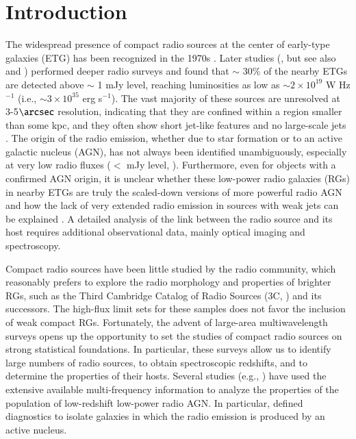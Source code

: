 \documentclass[traditabstract]{aa}
\begin{document}
\maketitle

\section{Introduction}

The widespread presence of compact radio sources at the center of
early-type galaxies (ETG) has been recognized in the 1970s
\citep{ekers73}. Later studies (\citealt{wrobel91b}, but see also
\citealt{sadler84} and \citealt{slee94}) performed deeper radio
surveys and found that $\sim$ 30\% of the nearby ETGs are detected
above $\sim$ 1 mJy level, reaching luminosities as low as
$\sim 2 \times 10^{19}$ W Hz$^{-1}$ (i.e., $\sim 3 \times 10^{35}$ erg
s$^{-1}$). The vast majority of these sources are unresolved at
3-5$\arcsec$ resolution, indicating that they are confined within a
region smaller than some kpc, and they often show short jet-like
features and no large-scale jets \citep{nagar05}. The origin of the
radio emission, whether due to star formation or to an active galactic
nucleus (AGN), has not always been identified unambiguously,
especially at very low radio fluxes ($<$ mJy level,
\citealt{bonzini13}). Furthermore, even for objects with a confirmed
AGN origin, it is unclear whether these low-power radio galaxies (RGs)
in nearby ETGs are truly the scaled-down versions of more powerful
radio AGN \citep{ho99} and how the lack of very extended radio
emission in sources with weak jets can be explained
\citep{fabbiano89}.  A detailed analysis of the link between the radio
source and its host requires additional observational data, mainly
optical imaging and spectroscopy.

Compact radio sources have been little studied by the radio community,
which reasonably prefers to explore the radio morphology and
properties of brighter RGs, such as the Third Cambridge Catalog of
Radio Sources (3C, \citealt{edge59,bennett62}) and its successors. The
high-flux limit sets for these samples does not favor the inclusion of
weak compact RGs. Fortunately, the advent of large-area
multiwavelength surveys opens up the opportunity to set the studies of
compact radio sources on strong statistical foundations. In
particular, these surveys allow us to identify large numbers of radio
sources, to obtain spectroscopic redshifts, and to determine the
properties of their hosts. Several studies (e.g.,
\citealt{best05b,baldi10b,best12,mingo16,miraghaei17}) have used the
extensive available multi-frequency information to analyze the
properties of the population of low-redshift low-power radio AGN. In
particular, \citet{best12} defined diagnostics to isolate galaxies in
which the radio emission is produced by an active nucleus.
\end{document}
